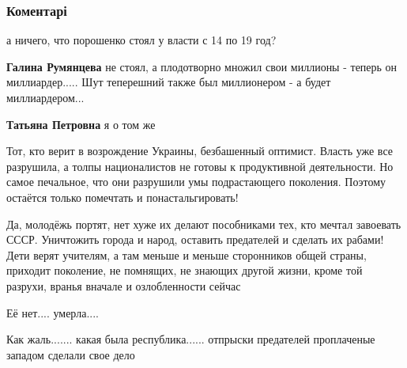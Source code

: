  
 
 
 
 
\subsubsection{Коментарі}
\label{sec:01_12_2021.fb.zhuravko_aleksej.1.ja_za_mir_na_ukraine.cmt}

\begin{itemize} %
а ничего, что порошенко стоял у власти с 14 по 19 год?

\begin{itemize} %
\textbf{Галина Румянцева} не стоял, а плодотворно множил свои миллионы - теперь он миллиардер..... Шут теперешний также был миллионером - а будет миллиардером...

\textbf{Татьяна Петровна} я о том же
\end{itemize} %


Тот, кто верит в возрождение Украины, безбашенный оптимист. Власть уже все
разрушила, а толпы националистов не готовы к продуктивной деятельности. Но самое
печальное, что они разрушили умы подрастающего поколения. Поэтому остаётся только
помечтать и понастальгировать!


Да, молодёжь портят, нет хуже их делают пособниками тех, кто мечтал завоевать
СССР. Уничтожить города и народ, оставить предателей и сделать их рабами! Дети
верят учителям, а там меньше и меньше сторонников общей страны, приходит
поколение, не помнящих, не знающих другой жизни, кроме той разрухи, вранья
вначале и озлобленности сейчас

Её нет.... умерла....


Как жаль....... какая была республика...... отпрыски предателей проплаченые
западом сделали свое дело

\end{itemize} %
